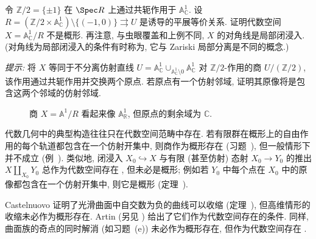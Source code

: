\begin{exercise}\label{src:4.9.7}
令 $\mathbb Z/2=\{\pm1\}$ 在 $\Spec\mathbb R$ 上通过共轭作用于 $\mathbb A^1_{\mathbb C}$. 设 $R=(\mathbb Z/2\times\mathbb A^1_{\mathbb C})\setminus\{(-1,0)\}\rightrightarrows U$ 是诱导的平展等价关系. 证明代数空间 $X=\mathbb A^1_{\mathbb C}/R$ 不是概形. 再注意, 与虫眼覆盖和上例不同, $X$ 的对角线是局部闭浸入. (对角线为局部闭浸入的条件有时称为, 它与 Zariski 局部分离是不同的概念.)

\textit{提示:} 将 $X$ 等同于不分离仿射直线 $U=\mathbb A^1_{\mathbb C}\cup_{\mathbb A^1_{\mathbb C}\setminus0}\mathbb A^1_{\mathbb C}$ 对 $\mathbb Z/2$-作用的商 $U/(\mathbb Z/2)$, 该作用通过共轭作用并交换两个原点. 若原点有一个仿射邻域, 证明其原像将是包含这两个邻域的仿射邻域.
\begin{figure}[H]
\centering
\caption{商 $X=\mathbb A^1/R$ 看起来像 $\mathbb A^1_{\mathbb R}$, 但原点的剩余域为 $\mathbb C$.}\label{src:4.9.8}
\end{figure}
\end{exercise}
\begin{remark}\label{src:4.9.9}
代数几何中的典型构造往往只在代数空间范畴中存在. 若有限群在概形上的自由作用的每个轨道都包含在一个仿射开集中, 则商作为概形存在 (习题~), 但一般情形下并不成立 (例~). 类似地, 闭浸入 $X_0\hookrightarrow X$ 与有限 (甚至仿射) 态射 $X_0\to Y_0$ 的推出 $X\amalg_{X_0}Y_0$ 总作为代数空间存在 \cite[定理 $6.1$]{Art70}, 但未必是概形; 例如若 $Y_0$ 中每个点在 $X_0$ 中的原像都包含在一个仿射开集中, 则它是概形 (定理~).

Castelnuovo 证明了光滑曲面中自交数为负的曲线可以收缩 (定理~), 但高维情形的收缩未必作为概形存在. Artin \cite[定理 $3.1$]{Art70} (另见 \cite{Maz75}) 给出了它们作为代数空间存在的条件. 同样, 曲面族的奇点的同时解消 (如习题~(e)) 未必作为概形存在, 但作为代数空间存在 \cite[定理 $1$]{Art74a}.
\end{remark}

